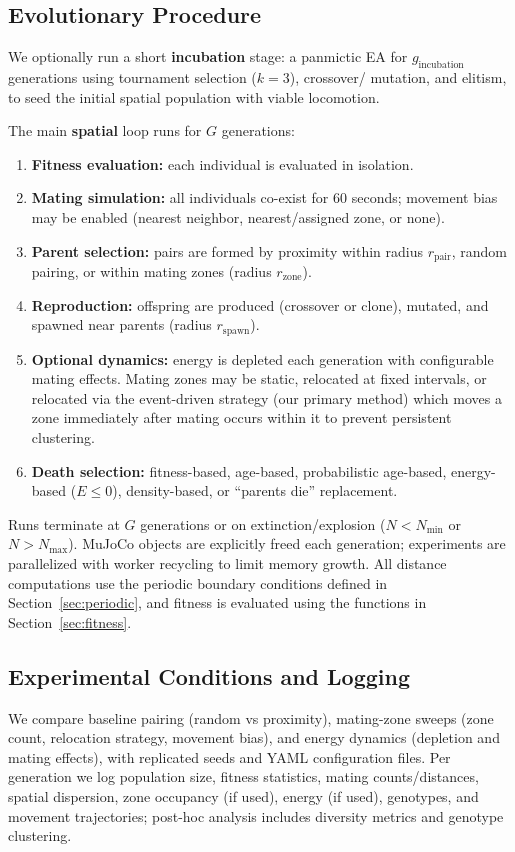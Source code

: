 \documentclass[dvipsnames,format=sigconf,anonymous=false,review=false]{acmart}
\begin{document}
\subsection{Evolutionary Procedure}
We optionally run a short \textbf{incubation} stage: a panmictic EA for $g_{\text{incubation}}$ generations using tournament selection ($k=3$), crossover/ mutation, and elitism, to seed the initial spatial population with viable locomotion.

The main \textbf{spatial} loop runs for $G$ generations:
\begin{enumerate}
  \item \textbf{Fitness evaluation:} each individual is evaluated in isolation.
  \item \textbf{Mating simulation:} all individuals co-exist for $60$ seconds; movement bias may be enabled (nearest neighbor, nearest/assigned zone, or none).
  \item \textbf{Parent selection:} pairs are formed by proximity within radius $r_{\text{pair}}$, random pairing, or within mating zones (radius $r_{\text{zone}}$).
  \item \textbf{Reproduction:} offspring are produced (crossover or clone), mutated, and spawned near parents (radius $r_{\text{spawn}}$).
  \item \textbf{Optional dynamics:} energy is depleted each generation with configurable mating effects. Mating zones may be static, relocated at fixed intervals, or relocated via the event-driven strategy (our primary method) which moves a zone immediately after mating occurs within it to prevent persistent clustering.
  \item \textbf{Death selection:} fitness-based, age-based, probabilistic age-based, energy-based ($E\le 0$), density-based, or ``parents die'' replacement.
\end{enumerate}
Runs terminate at $G$ generations or on extinction/explosion ($N<N_{\min}$ or $N>N_{\max}$). MuJoCo objects are explicitly freed each generation; experiments are parallelized with worker recycling to limit memory growth. All distance computations use the periodic boundary conditions defined in Section~\ref{sec:periodic}, and fitness is evaluated using the functions in Section~\ref{sec:fitness}.

\subsection{Experimental Conditions and Logging}
We compare baseline pairing (random vs proximity), mating-zone sweeps (zone count, relocation strategy, movement bias), and energy dynamics (depletion and mating effects), with replicated seeds and YAML configuration files. Per generation we log population size, fitness statistics, mating counts/distances, spatial dispersion, zone occupancy (if used), energy (if used), genotypes, and movement trajectories; post-hoc analysis includes diversity metrics and genotype clustering.
\end{document}
